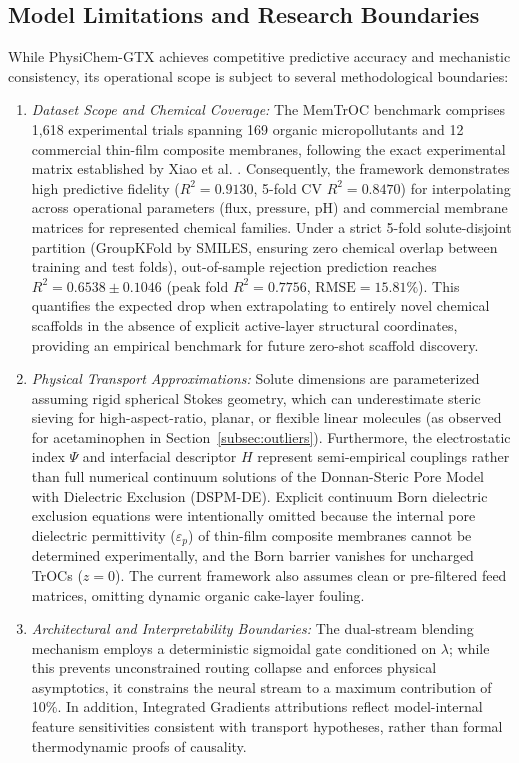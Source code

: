 \documentclass[11pt]{article}
\newcommand{\rsq}{R^{2}}
\begin{document}
\subsection{Model Limitations and Research Boundaries}
While PhysiChem-GTX achieves competitive predictive accuracy and mechanistic consistency, its operational scope is subject to several methodological boundaries:
\begin{enumerate}[leftmargin=1.3em,itemsep=2pt,topsep=2pt]
\item \textit{Dataset Scope and Chemical Coverage:} The MemTrOC benchmark comprises 1,618 experimental trials spanning 169 organic micropollutants and 12 commercial thin-film composite membranes, following the exact experimental matrix established by Xiao et al. \cite{xiao2026}. Consequently, the framework demonstrates high predictive fidelity ($\rsq = 0.9130$, 5-fold CV $\rsq = 0.8470$) for interpolating across operational parameters (flux, pressure, pH) and commercial membrane matrices for represented chemical families. Under a strict 5-fold solute-disjoint partition (GroupKFold by SMILES, ensuring zero chemical overlap between training and test folds), out-of-sample rejection prediction reaches $\rsq = 0.6538 \pm 0.1046$ (peak fold $\rsq = 0.7756$, $\mathrm{RMSE} = 15.81\%$). This quantifies the expected drop when extrapolating to entirely novel chemical scaffolds in the absence of explicit active-layer structural coordinates, providing an empirical benchmark for future zero-shot scaffold discovery.
\item \textit{Physical Transport Approximations:} Solute dimensions are parameterized assuming rigid spherical Stokes geometry, which can underestimate steric sieving for high-aspect-ratio, planar, or flexible linear molecules (as observed for acetaminophen in Section~\ref{subsec:outliers}). Furthermore, the electrostatic index $\Psi$ and interfacial descriptor $H$ represent semi-empirical couplings rather than full numerical continuum solutions of the Donnan-Steric Pore Model with Dielectric Exclusion (DSPM-DE). Explicit continuum Born dielectric exclusion equations were intentionally omitted because the internal pore dielectric permittivity ($\varepsilon_p$) of thin-film composite membranes cannot be determined experimentally, and the Born barrier vanishes for uncharged TrOCs ($z=0$). The current framework also assumes clean or pre-filtered feed matrices, omitting dynamic organic cake-layer fouling.
\item \textit{Architectural and Interpretability Boundaries:} The dual-stream blending mechanism employs a deterministic sigmoidal gate conditioned on $\lambda$; while this prevents unconstrained routing collapse and enforces physical asymptotics, it constrains the neural stream to a maximum contribution of 10\%. In addition, Integrated Gradients attributions reflect model-internal feature sensitivities consistent with transport hypotheses, rather than formal thermodynamic proofs of causality.
\end{enumerate}
\end{document}
